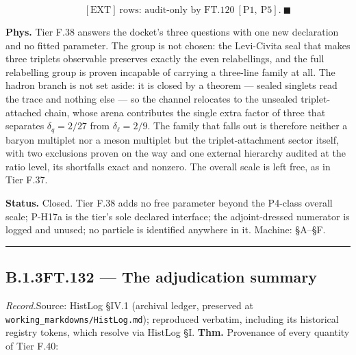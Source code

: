 \documentclass[11pt,openany]{report}
\theoremstyle{canonplain}
\theoremstyle{canondef}
\begin{document}
\[
\qquad [\text{EXT}]\ \text{rows: audit-only by FT.120}\ [\text{P1},\ \text{P5}].\ \blacksquare
\]

\textbf{Phys.} Tier F.38 answers the docket's three questions with one new declaration and no fitted parameter. The group is not chosen: the Levi-Civita seal that makes three triplets observable preserves exactly the even relabellings, and the full relabelling group is proven incapable of carrying a three-line family at all. The hadron branch is not set aside: it is closed by a theorem — sealed singlets read the trace and nothing else — so the channel relocates to the unsealed triplet-attached chain, whose arena contributes the single extra factor of three that separates $\delta_q=2/27$ from $\delta_\ell=2/9$. The family that falls out is therefore neither a baryon multiplet nor a meson multiplet but the triplet-attachment sector itself, with two exclusions proven on the way and one external hierarchy audited at the ratio level, its shortfalls exact and nonzero. The overall scale is left free, as in Tier F.37.

\textbf{Status.} Closed. Tier F.38 adds no free parameter beyond the P4-class overall scale; P-H17a is the tier's sole declared interface; the adjoint-dressed numerator is logged and unused; no particle is identified anywhere in it. Machine: §A–§F.

\vspace{2pt}\noindent\rule{\textwidth}{0.4pt}\vspace{2pt}

\medskip
\subsection*{\texorpdfstring{B.1.3\quad FT.132 — The adjudication summary}{FT.132 B.1.3}}
\label{tag:FT-132}
{\small \textit{Record.}\quad Source: HistLog §IV.1 (archival ledger, preserved at \texttt{working\_markdowns/HistLog.md}); reproduced verbatim, including its historical registry tokens, which resolve via HistLog \S I.}
\medskip
\textbf{Thm.} Provenance of every quantity of Tier F.40:
\end{document}
